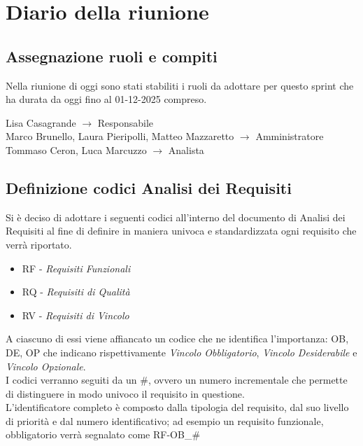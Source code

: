 \section{Diario della riunione}
\subsection{Assegnazione ruoli e compiti}
Nella riunione di oggi sono stati stabiliti i ruoli da adottare per questo sprint che ha durata da oggi fino al 01-12-2025 compreso.\\
\begin{center}
	Lisa Casagrande $\to$ Responsabile \\
	Marco Brunello, Laura Pieripolli, Matteo Mazzaretto $\to$ Amministratore\\
	Tommaso Ceron, Luca Marcuzzo $\to$ Analista \\
\end{center}
\subsection{Definizione codici Analisi dei Requisiti}
Si è deciso di adottare i seguenti codici all'interno del documento di Analisi dei Requisiti al fine di definire in maniera univoca e standardizzata ogni requisito che verrà riportato.
\begin{itemize}
	\item RF - \textit{Requisiti Funzionali}
	\item RQ - \textit{Requisiti di Qualità}
	\item RV - \textit{Requisiti di Vincolo}
\end{itemize}
A ciascuno di essi viene affiancato un codice che ne identifica l'importanza: OB, DE, OP che indicano rispettivamente \textit{Vincolo Obbligatorio}, \textit{Vincolo Desiderabile} e \textit{Vincolo Opzionale}.\\
I codici verranno seguiti da un \#, ovvero un numero incrementale che permette di distinguere in modo univoco il requisito in questione.\\
L’identificatore completo è composto dalla tipologia del requisito, dal suo livello di priorità e dal numero identificativo; ad esempio un requisito funzionale, obbligatorio verrà segnalato come RF-OB\_\#

